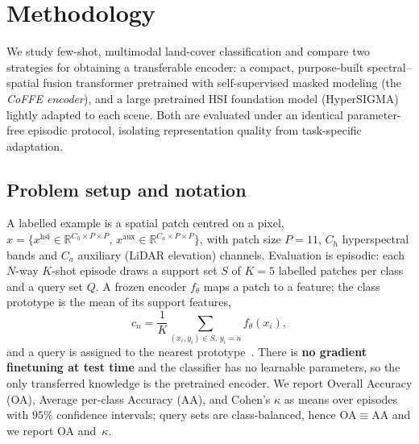%

\section{Methodology}
\label{sec:method}

We study few-shot, multimodal land-cover classification and compare two
strategies for obtaining a transferable encoder: a compact, purpose-built
spectral--spatial fusion transformer pretrained with self-supervised masked
modeling (the \emph{CoFFE encoder}), and a large pretrained HSI foundation model
(HyperSIGMA) lightly adapted to each scene. Both are evaluated under an identical
parameter-free episodic protocol, isolating representation quality from
task-specific adaptation.

\subsection{Problem setup and notation}
\label{subsec:setup}
A labelled example is a spatial patch centred on a pixel,
$x = \{x^{\text{hsi}}\!\in\!\mathbb{R}^{C_h\times P\times P},\,
        x^{\text{aux}}\!\in\!\mathbb{R}^{C_a\times P\times P}\}$,
with patch size $P{=}11$, $C_h$ hyperspectral bands and $C_a$ auxiliary (LiDAR
elevation) channels. Evaluation is episodic: each $N$-way $K$-shot episode draws
a support set $S$ of $K{=}5$ labelled patches per class and a query set $Q$. A
frozen encoder $f_\theta$ maps a patch to a feature; the class prototype is the
mean of its support features,
\begin{equation}
  c_n = \frac{1}{K}\!\!\sum_{(x_i,y_i)\in S,\, y_i=n}\!\! f_\theta(x_i),
  \label{eq:prototype}
\end{equation}
and a query is assigned to the nearest prototype~\cite{snell2017proto}. There is
\textbf{no gradient finetuning at test time} and the classifier has no learnable
parameters, so the only transferred knowledge is the pretrained encoder. We
report Overall Accuracy (OA), Average per-class Accuracy (AA), and Cohen's
$\kappa$ as means over episodes with $95\%$ confidence intervals; query sets are
class-balanced, hence OA${\equiv}$AA and we report OA and~$\kappa$.

